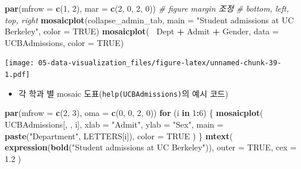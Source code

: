 \documentclass[
  11pt,
]{krantz}
\newenvironment{Shaded}{\begin{snugshade}}{\end{snugshade}}
\newcommand{\CommentTok}[1]{\textcolor[rgb]{0.37,0.37,0.37}{\textit{#1}}}
\newcommand{\ControlFlowTok}[1]{\textcolor[rgb]{0.27,0.27,0.27}{\textbf{#1}}}
\newcommand{\DataTypeTok}[1]{\textcolor[rgb]{0.27,0.27,0.27}{#1}}
\newcommand{\DecValTok}[1]{\textcolor[rgb]{0.06,0.06,0.06}{#1}}
\newcommand{\FloatTok}[1]{\textcolor[rgb]{0.06,0.06,0.06}{#1}}
\newcommand{\KeywordTok}[1]{\textcolor[rgb]{0.27,0.27,0.27}{\textbf{#1}}}
\newcommand{\NormalTok}[1]{#1}
\newcommand{\OperatorTok}[1]{\textcolor[rgb]{0.43,0.43,0.43}{\textbf{#1}}}
\newcommand{\OtherTok}[1]{\textcolor[rgb]{0.37,0.37,0.37}{#1}}
\newcommand{\StringTok}[1]{\textcolor[rgb]{0.5,0.5,0.5}{#1}}
\providecommand{\tightlist}{%
  \setlength{\itemsep}{0pt}\setlength{\parskip}{0pt}}
\begin{document}
\begin{Shaded}
\begin{Highlighting}[]
\KeywordTok{par}\NormalTok{(}\DataTypeTok{mfrow =} \KeywordTok{c}\NormalTok{(}\DecValTok{1}\NormalTok{, }\DecValTok{2}\NormalTok{), }
    \DataTypeTok{mar =} \KeywordTok{c}\NormalTok{(}\DecValTok{2}\NormalTok{, }\DecValTok{0}\NormalTok{, }\DecValTok{2}\NormalTok{, }\DecValTok{0}\NormalTok{)) }\CommentTok{# figure margin 조정}
                         \CommentTok{# bottom, left, top, right}
\KeywordTok{mosaicplot}\NormalTok{(collapse_admin_tab, }
           \DataTypeTok{main =} \StringTok{"Student admissions at UC Berkeley"}\NormalTok{, }
           \DataTypeTok{color =} \OtherTok{TRUE}\NormalTok{)}
\KeywordTok{mosaicplot}\NormalTok{(}\OperatorTok{~}\StringTok{ }\NormalTok{Dept }\OperatorTok{+}\StringTok{ }\NormalTok{Admit }\OperatorTok{+}\StringTok{ }\NormalTok{Gender, }\DataTypeTok{data =}\NormalTok{ UCBAdmissions, }
           \DataTypeTok{color =} \OtherTok{TRUE}\NormalTok{)}
\end{Highlighting}
\end{Shaded}

\texttt{[image: 05-data-visualization\_files/figure-latex/unnamed-chunk-39-1.pdf]}

\normalsize

\begin{itemize}
\tightlist
\item
  각 학과 별 mosaic 도표(\texttt{help(UCBAdmissions)}의 예시 코드)
\end{itemize}

\footnotesize

\begin{Shaded}
\begin{Highlighting}[]
\KeywordTok{par}\NormalTok{(}\DataTypeTok{mfrow =} \KeywordTok{c}\NormalTok{(}\DecValTok{2}\NormalTok{, }\DecValTok{3}\NormalTok{), }
    \DataTypeTok{oma =} \KeywordTok{c}\NormalTok{(}\DecValTok{0}\NormalTok{, }\DecValTok{0}\NormalTok{, }\DecValTok{2}\NormalTok{, }\DecValTok{0}\NormalTok{))}
\ControlFlowTok{for}\NormalTok{ (i }\ControlFlowTok{in} \DecValTok{1}\OperatorTok{:}\DecValTok{6}\NormalTok{) \{}
  \KeywordTok{mosaicplot}\NormalTok{(}
\NormalTok{    UCBAdmissions[, , i], }
    \DataTypeTok{xlab =} \StringTok{"Admit"}\NormalTok{, }
    \DataTypeTok{ylab =} \StringTok{"Sex"}\NormalTok{, }
    \DataTypeTok{main =} \KeywordTok{paste}\NormalTok{(}\StringTok{"Department"}\NormalTok{, LETTERS[i]), }
    \DataTypeTok{color =} \OtherTok{TRUE}
\NormalTok{  )}
\NormalTok{\}}
\KeywordTok{mtext}\NormalTok{(}
  \KeywordTok{expression}\NormalTok{(}\KeywordTok{bold}\NormalTok{(}\StringTok{"Student admissions at UC Berkeley"}\NormalTok{)), }
  \DataTypeTok{outer =} \OtherTok{TRUE}\NormalTok{, }
  \DataTypeTok{cex =} \FloatTok{1.2}
\NormalTok{)}
\end{Highlighting}
\end{Shaded}
\end{document}
